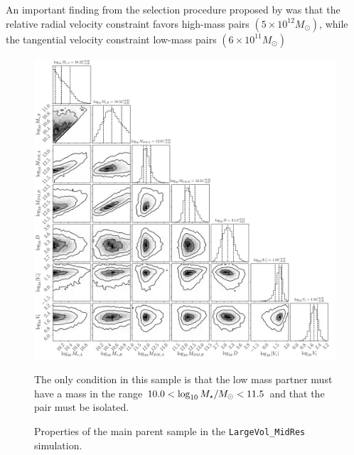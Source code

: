 \documentclass[fleqn,usenatbib]{mnras}
\begin{document}
An important finding from the selection procedure proposed by \cite{fattahi2016apostle} was that the relative radial velocity constraint favors high-mass pairs $(5\times 10^{12} M_\odot)$, while the tangential velocity constraint low-mass pairs $(6\times 10^{11} M_\odot)$







\begin{figure}
\centering
\includegraphics[scale=0.4]{full_corner_L205n2500.pdf}
\caption{\label{fig:prop_100_300} 
Properties of the main parent sample in the \texttt{LargeVol\_MidRes} simulation.}
The only condition in this sample is that the low mass partner must
have a mass in the range $10.0<\log_{\rm 10}M_{\star}/M_{\odot}<11.5$ and that the pair must be isolated. 
\end{figure}
\end{document}
